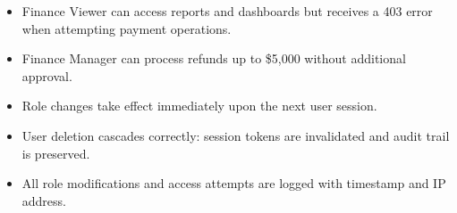 \begin{tcolorbox}
  \begin{tcolorbox}[
    enhanced,
    colback=bgLight,
    colframe=statusPass,
    boxrule=0.5pt,
    left=10pt,
    right=10pt,
    top=6pt,
    bottom=6pt,
    sharp corners,
    title={\passmark\ Acceptance Criteria},
    fonttitle=\bfseries\color{statusPass}
  ]
    \begin{itemize}[nosep, leftmargin=*]
      \item Finance Viewer can access reports and dashboards but receives a 403 error when attempting payment operations.
      \item Finance Manager can process refunds up to \$5,000 without additional approval.
      \item Role changes take effect immediately upon the next user session.
      \item User deletion cascades correctly: session tokens are invalidated and audit trail is preserved.
      \item All role modifications and access attempts are logged with timestamp and IP address.
    \end{itemize}
  \end{tcolorbox}
\end{tcolorbox}

\vspace{12pt}
